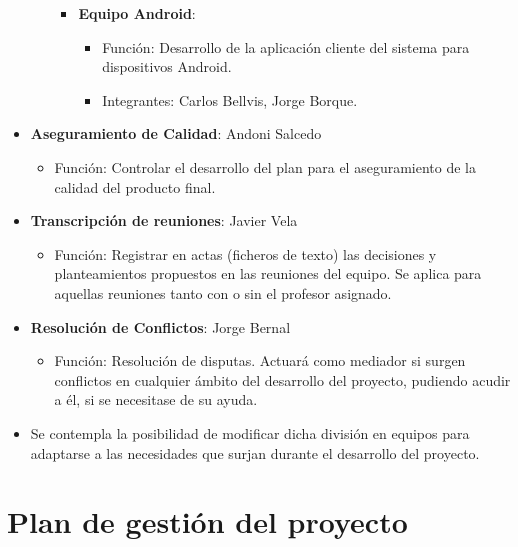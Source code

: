 \documentclass{article}
\begin{document}
\begin{itemize}
\begin{itemize}
\begin{itemize}
\begin{itemize}
           \end{itemize}
           \item \textbf{Equipo Android}:
           \begin{itemize}
               \setlength{\itemsep}{0em}
               \item Función: Desarrollo de la aplicación cliente del sistema para dispositivos Android.
               \item Integrantes: Carlos Bellvis, Jorge Borque.
           \end{itemize}
       \end{itemize}
   \end{itemize}
   \item \textbf{Aseguramiento de Calidad}: Andoni Salcedo
   \begin{itemize}
       \setlength{\itemsep}{0em}
       \item Función: Controlar el desarrollo del plan para el aseguramiento de la calidad del producto final.
   \end{itemize}
   \item \textbf{Transcripción de reuniones}: Javier Vela
   \begin{itemize}
       \setlength{\itemsep}{0em}
       \item Función: Registrar en actas (ficheros de texto) las decisiones y planteamientos propuestos en las reuniones del equipo. Se aplica para aquellas reuniones tanto con o sin el profesor asignado.
   \end{itemize}
   \item \textbf{Resolución de Conflictos}: Jorge Bernal
   \begin{itemize}
       \setlength{\itemsep}{0em}
       \item Función: Resolución de disputas. Actuará como mediador si surgen conflictos en cualquier ámbito del desarrollo del proyecto, pudiendo acudir a él, si se necesitase de su ayuda.
   \end{itemize}
   \item Se contempla la posibilidad de modificar dicha división en equipos para adaptarse a las necesidades que surjan durante el desarrollo del proyecto.
\end{itemize}

\pagebreak

\section{Plan de gestión del proyecto}
\end{document}
